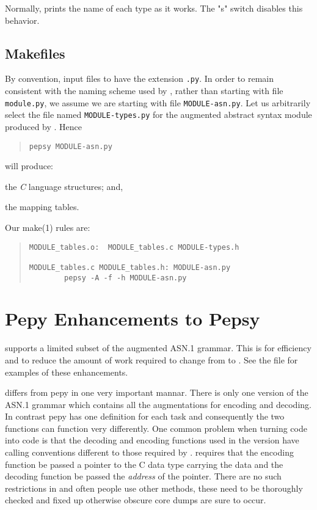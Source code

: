 Normally,  prints the name of each type as it works.
The \switch"s" switch disables this behavior.

\subsection	{Makefiles}
By convention,
input files to  have the extension \verb".py".
In order to remain consistent with the naming scheme used by ,
rather than starting with file \verb"module.py",
we assume we are starting with file \verb"MODULE-asn.py".
Let us arbitrarily select the file named \verb"MODULE-types.py" for the
augmented abstract syntax module produced by .
Hence
\begin{quote}\begin{verbatim}
pepsy MODULE-asn.py
\end{verbatim}\end{quote}
will produce:
\begin{describe}
\item[\verb"MODULE-types.h":]	the {\em C\/} language structures;
				and,

\item[\verb"MODULE\_tables.c":]	the mapping tables.
\end{describe}

Our \man make(1) rules are:
\begin{quote}\small\begin{verbatim}
MODULE_tables.o:  MODULE_tables.c MODULE-types.h

MODULE_tables.c MODULE_tables.h: MODULE-asn.py
		pepsy -A -f -h MODULE-asn.py
\end{verbatim}\end{quote}

\section{Pepy Enhancements to Pepsy}

 supports a limited subset of the  augmented
ASN.1 grammar.
This is for efficiency and to reduce the amount of work required to
change from  to .
See the file  for examples of these enhancements.

 differs from pepy in one very important mannar.
There is only one version of the ASN.1 grammar which contains all
the augmentations for encoding and decoding.
In contrast pepy has one definition for each task and consequently
the two functions can function very differently.
One common problem when turning 
code into  code is that the decoding
and encoding functions used in the  version have calling conventions
different to those required by .
 requires that the encoding function be passed a pointer to the
C data type carrying the data and the decoding function be passed the
{\em address} of the pointer.
There are no such restrictions in  and often people use other
methods, these need to be thoroughly checked and fixed up otherwise
obscure core dumps are sure to occur.

